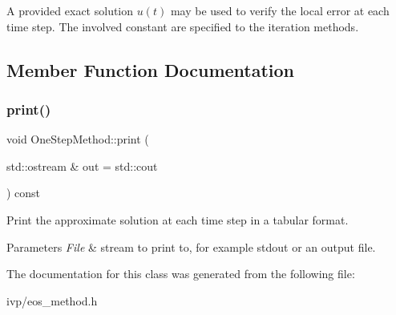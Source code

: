 A provided {\ttfamily exact} solution $u(t)$ may be used to verify the local error at each time step. The involved constant are specified to the iteration methods. 

\subsection{Member Function Documentation}
\mbox{\label{classOneStepMethod_aa3fc1d095086c736ef23c60e56034474}} 
\subsubsection{\texorpdfstring{print()}{print()}}
{\footnotesize\ttfamily void One\+Step\+Method\+::print (\begin{DoxyParamCaption}\item[{std\+::ostream \&}]{out = {\ttfamily std\+:\+:cout} }\end{DoxyParamCaption}) const\hspace{0.3cm}{\ttfamily [inline]}}



Print the approximate solution at each time step in a tabular format. 


\begin{DoxyParams}{Parameters}
{\em File} & stream to print to, for example stdout or an output file. \\
\hline
\end{DoxyParams}


The documentation for this class was generated from the following file\+:\begin{DoxyCompactItemize}
\item 
ivp/eos\+\_\+method.\+h\end{DoxyCompactItemize}
